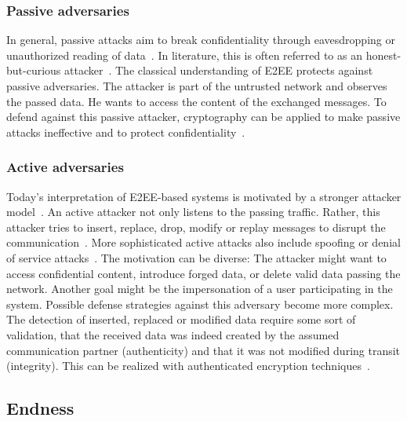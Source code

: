 \documentclass[../main.tex]{subfiles}
\begin{document}
\subsubsection{Passive adversaries}
In general, passive attacks aim to break confidentiality through eavesdropping or unauthorized reading of data~\cite[18]{Eckert2018}. 
In literature, this is often referred to as an honest-but-curious attacker~\cite{Nabeel2017}.
The classical understanding of E2EE protects against passive adversaries. 
The attacker is part of the untrusted network and observes the passed data.
He wants to access the content of the exchanged messages.
To defend against this passive attacker, cryptography can be applied to make passive attacks ineffective and to protect confidentiality~\cite[18]{Eckert2018}.


\subsubsection{Active adversaries}
Today's interpretation of E2EE-based systems is motivated by a stronger attacker model~\cite{Hale2022}.
An active attacker not only listens to the passing traffic.
Rather, this attacker tries to insert, replace, drop, modify or replay messages to disrupt the communication~\cite{Nabeel2017}.
More sophisticated active attacks also include spoofing or denial of service attacks~\cite[19]{Eckert2018}.
The motivation can be diverse: 
The attacker might want to access confidential content, introduce forged data, or delete valid data passing the network.
Another goal might be the impersonation of a user participating in the system.
Possible defense strategies against this adversary become more complex.
The detection of inserted, replaced or modified data require some sort of validation, that the received data was indeed created by the assumed communication partner (authenticity) and that it was not modified during transit (integrity).
This can be realized with authenticated encryption techniques~\cite{Mallory2022}.

\subsection{Endness}
\end{document}
